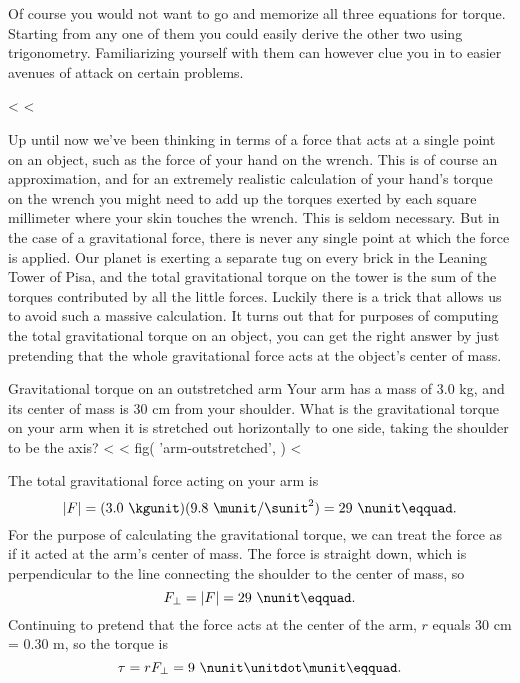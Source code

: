 Of course you would not want to go and memorize all three
equations for torque. Starting from any one of them you
could easily derive the other two using trigonometry.
Familiarizing yourself with them can however clue you in to
easier avenues of attack on certain problems.

<%
<%

Up until now we've been thinking in terms of a force that
acts at a single point on an object, such as the force of
your hand on the wrench. This is of course an approximation,
and for an extremely realistic calculation of your hand's
torque on the wrench you might need to add up the torques
exerted by each square millimeter where your skin touches
the wrench. This is seldom necessary. But in the case of a
gravitational force, there is never any single point at
which the force is applied. Our planet is exerting a
separate tug on every brick in the Leaning Tower of Pisa,
and the total gravitational torque on the tower is the sum
of the torques contributed by all the little forces. Luckily
there is a trick that allows us to avoid such a massive
calculation. It turns out that for purposes of computing the
total gravitational torque on an object, you can get the
right answer by just pretending that the whole gravitational
force acts at the object's center of mass.

\begin{eg}{Gravitational torque on an outstretched arm}\label{eg:arm-outstretched}
\egquestion Your arm has a mass of 3.0 kg, and its center of
mass is 30 cm from your shoulder. What is the gravitational
torque on your arm when it is stretched out horizontally to
one side, taking the shoulder to be the axis?
<%
<%
  fig(
    'arm-outstretched',
  )
<%

\eganswer The total gravitational force acting on your arm is
\begin{equation*} 
|F|= (3.0\ \kgunit)(9.8\ \munit/\sunit^2)= 29\ \nunit\eqquad.
\end{equation*}
For the purpose of calculating the gravitational torque, we
can treat the force as if it acted at the arm's center of
mass. The force is straight down, which is perpendicular to
the line connecting the shoulder to the center of mass, so
\begin{equation*}
 F_{\perp} =|F|= 29\ \nunit\eqquad.
\end{equation*}
Continuing to pretend that the force acts at the center of
the arm, $r$ equals 30 cm = 0.30 m, so the torque is
\begin{equation*}
 \tau =r F_{\perp} = 9\ \nunit\unitdot\munit\eqquad.
\end{equation*}
\end{eg}

